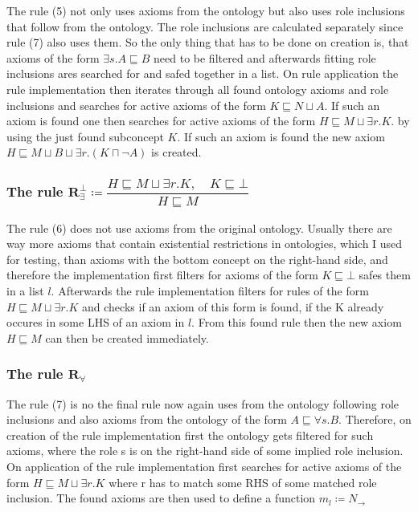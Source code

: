 \documentclass[titlepage]{article}
\begin{document}
 The rule (5) not only uses axioms from the ontology but also uses role inclusions that
follow from the ontology. The role inclusions are calculated separately since rule (7) 
also uses them. So the only thing that has to be done on creation is, that axioms of the form
$\exists s.A \sqsubseteq B$ need to be filtered and afterwards fitting role inclusions ares searched for
and safed together in a list. 
On rule application the rule implementation then iterates through all found ontology axioms and role inclusions
and searches for active axioms of the form  $K \sqsubseteq N \sqcup A$. If such an axiom is found
one then searches for active axioms of the form $H \sqsubseteq M \sqcup \exists r.K$. by using the
just found subconcept $K$. If such an axiom is found the new axiom $H \sqsubseteq M \sqcup B \sqcup \exists r.(K \sqcap \neg A)$
is created.


\subsubsection{The rule $\mathbf{R^\bot_{\exists}} \coloneq \dfrac{H \sqsubseteq M \sqcup \exists r.K,\quad K \sqsubseteq \bot}{H \sqsubseteq M}$}
The rule (6) does not use axioms from the original ontology. Usually there are way more axioms that contain existential restrictions 
in ontologies, which I used for testing,
than axioms with the bottom concept on the right-hand side, and
therefore the implementation first filters for axioms of the form $K \sqsubseteq \bot$ safes them
in a list $l$. Afterwards
the rule implementation filters for rules of the form $H \sqsubseteq M \sqcup \exists r.K $
and checks if an axiom of this form is found, if the K already occures in some LHS of an axiom in
$l$. From this found rule then the new axiom $H \sqsubseteq M$ can then be created immediately.

\subsubsection{The rule $\mathbf{R_{\forall}}$}
The rule (7) is no the final rule now again uses from the ontology following role inclusions
and also axioms from the ontology of the form $A \sqsubseteq \forall s.B$. Therefore, on 
creation of the rule implementation first the ontology gets filtered for such axioms, where 
the role s is on the right-hand side of some implied role inclusion.
On application of the rule implementation first searches for active axioms of the form
$H \sqsubseteq M \sqcup \exists r.K$ where r has to match some RHS of some matched role inclusion.
The found axioms are then used to define a function $m_l \coloneqq N_ \rightarrow$
\end{document}
